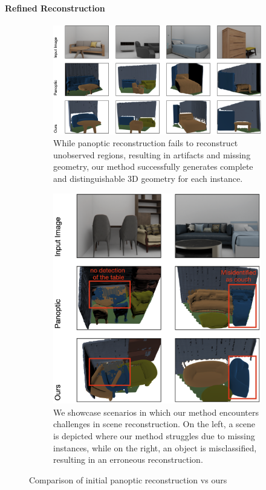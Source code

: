 \paragraph{Refined Reconstruction}

\begin{figure}%
  \begin{subfigure}[t]{109mm}
    \includegraphics[width=\linewidth]{images/image1.png}
    \caption{While panoptic reconstruction fails to reconstruct unobserved regions, resulting in artifacts and missing geometry, our method successfully generates complete and distinguishable 3D geometry for each instance.}\label{fig:comparison_good}
  \end{subfigure}
  \qquad
  \begin{subfigure}[t]{56mm}
    \includegraphics[width=\linewidth]{images/image2.png}
    \caption{We showcase scenarios in which our method encounters challenges in scene reconstruction. On the left, a scene is depicted where our method struggles due to missing instances, while on the right, an object is misclassified, resulting in an erroneous reconstruction.}\label{fig:comparison_bad}
  \end{subfigure}
  \caption{Comparison of initial panoptic reconstruction \citep{dahnert2021panoptic} vs ours}
  \label{fig:comparison_all}
\end{figure}

